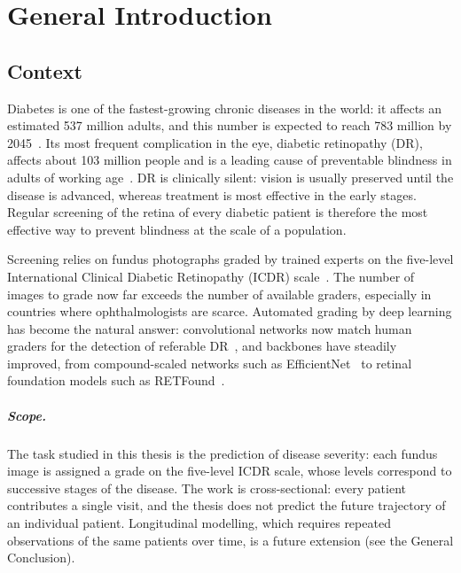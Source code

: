 \chapter*{General Introduction}
\label{ch:intro}

\section*{Context}

Diabetes is one of the fastest-growing chronic diseases in the world: it affects an
estimated 537 million adults, and this number is expected to reach 783 million by
2045~\cite{idf2021atlas}. Its most frequent complication in the eye, diabetic retinopathy
(DR), affects about 103 million people and is a leading cause of preventable blindness in
adults of working age~\cite{teo2021global,cheung2010dr}. DR is clinically
silent: vision is usually preserved until the disease is advanced, whereas treatment is
most effective in the early stages. Regular screening of the retina of every diabetic
patient is therefore the most effective way to prevent blindness at the scale of a population.

Screening relies on fundus photographs graded by trained experts on the five-level
International Clinical Diabetic Retinopathy (ICDR) scale~\cite{wilkinson2003icdr}. The number of images to grade now far
exceeds the number of available graders, especially in countries where ophthalmologists
are scarce. Automated grading by deep learning has become the natural answer: convolutional
networks now match human graders for the detection of referable
DR~\cite{gulshan2016jama,ting2017jama}, and backbones have steadily improved, from
compound-scaled networks such as EfficientNet~\cite{tan2019efficientnet} to retinal
foundation models such as RETFound~\cite{zhou2023retfound}.

\paragraph{Scope.}
The task studied in this thesis is the prediction of disease severity: each fundus image
is assigned a grade on the five-level ICDR scale, whose levels correspond to successive
stages of the disease. The work is cross-sectional: every patient contributes a single
visit, and the thesis does not predict the future trajectory of an individual patient.
Longitudinal modelling, which requires repeated observations of the same patients over
time, is a future extension (see the General Conclusion).

